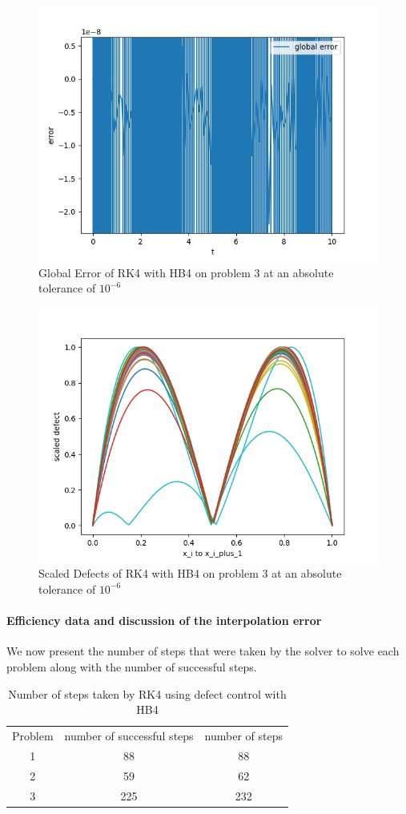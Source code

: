 \documentclass{article}
\begin{document}
\begin{figure}[H]
\centering
\includegraphics[width=0.7\linewidth]{./figures/rk4_with_hb4_p3_global_error}
\caption{Global Error of RK4 with HB4 on problem 3 at an absolute tolerance of $10^{-6}$}
\label{fig:rk4_with_hb4_p3_global_error}
\end{figure}

\begin{figure}[H]
\centering
\includegraphics[width=0.7\linewidth]{./figures/rk4_with_hb4_p3_scaled_defects}
\caption{Scaled Defects of RK4 with HB4 on problem 3 at an absolute tolerance of $10^{-6}$}
\label{fig:rk4_with_hb4_p3_scaled_defects}
\end{figure}

\paragraph{Efficiency data and discussion of the interpolation error}
We now present the number of steps that were taken by the solver to solve each problem along with the number of successful steps.

\begin{table}[h]
\caption {Number of steps taken by RK4 using defect control with HB4} \label{tab:rk4_with_hb4_nsteps}
\begin{center}
\begin{tabular}{ c c c } 
Problem & number of successful steps & number of steps \\ 
1       & 88                         & 88 \\ 
2       & 59                         & 62 \\
3       & 225                        & 232 \\
\end{tabular}
\end{center}
\end{table}
\end{document}
